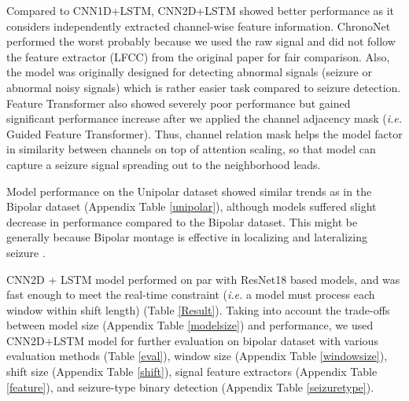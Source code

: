 \documentclass[pmlr,twocolumn,10pt]{jmlr}
\begin{document}
Compared to CNN1D+LSTM, CNN2D+LSTM showed better performance as it considers independently extracted channel-wise feature information.
ChronoNet \citep{roy2019chrononet} performed the worst probably because we used the raw signal and did not follow the feature extractor (LFCC) from the original paper for fair comparison. Also, the model was originally designed for detecting abnormal signals (seizure or abnormal noisy signals) which is rather easier task compared to seizure detection.
Feature Transformer also showed severely poor performance but gained significant performance increase after we applied the channel adjacency mask (\textit{i.e.} Guided Feature Transformer).
Thus, channel relation mask helps the model factor in similarity between channels on top of attention scaling, so that model can capture a seizure signal spreading out to the neighborhood leads.

Model performance on the Unipolar dataset showed similar trends as in the Bipolar dataset (Appendix Table \ref{unipolar}), although models suffered slight decrease in performance compared to the Bipolar dataset.
This might be generally because Bipolar montage is effective in localizing and lateralizing seizure \citep{beniczky2020electroencephalography}. 

CNN2D + LSTM model performed on par with ResNet18 based models, and was fast enough to meet the real-time constraint (\textit{i.e.} a model must process each window within shift length) (Table \ref{Result}). Taking into account the trade-offs between model size (Appendix Table \ref{modelsize}) and performance, we used CNN2D+LSTM model for further evaluation on bipolar dataset with various evaluation methods (Table \ref{eval}), window size (Appendix Table \ref{windowsize}), shift size (Appendix Table \ref{shift}), signal feature extractors (Appendix Table \ref{feature}), and seizure-type binary detection (Appendix Table \ref{seizuretype}). 
\end{document}
